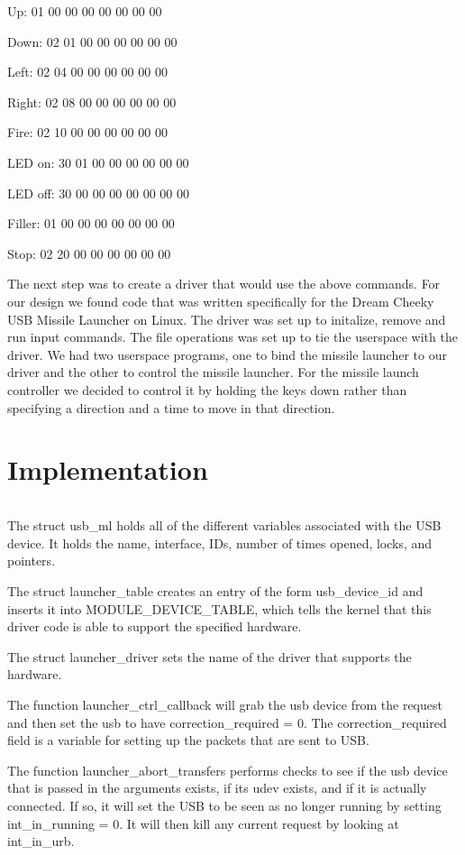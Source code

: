 \documentclass[letterpaper,10pt,titlepage]{article}
\begin{document}
Up: 01 00 00 00 00 00 00 00

Down: 02 01 00 00 00 00 00 00

Left: 02 04 00 00 00 00 00 00 

Right: 02 08 00 00 00 00 00 00

Fire: 02 10 00 00 00 00 00 00 

LED on: 30 01 00 00 00 00 00 00

LED off: 30 00 00 00 00 00 00 00

Filler: 01 00 00 00 00 00 00 00

Stop: 02 20 00 00 00 00 00 00


The next step was to create a driver that would use the above commands. For our design we found code that was written specifically for the Dream Cheeky USB Missile Launcher on Linux. The driver was set up to initalize, remove and run input commands. The file operations was set up to tie the userspace with the driver. We had two userspace programs, one to bind the missile launcher to our driver and the other to control the missile launcher. For the missile launch controller we decided to control it by holding the keys down rather than specifying a direction and a time to move in that direction.

\section{Implementation}
\begin{quotation}
\begin{verbatim}
\end{verbatim}
\end{quotation}
The struct usb\_ml holds all of the different variables associated with the USB device. It holds the name, interface, IDs, number of times opened, locks, and pointers.

The struct launcher\_table creates an entry of the form usb\_device\_id and inserts it into MODULE\_DEVICE\_TABLE, which tells the kernel that this driver code is able to support the specified hardware.

The struct launcher\_driver sets the name of the driver that supports the hardware.

The function launcher\_ctrl\_callback will grab the usb device from the request and then set the usb to have correction\_required = 0. The correction\_required field is a variable for setting up the packets that are sent to USB.

The function launcher\_abort\_transfers performs checks to see if the usb device that is passed in the arguments exists, if its udev exists, and if it is actually connected. If so, it will set the USB to be seen as no longer running by setting int\_in\_running = 0. It will then kill any current request by looking at int\_in\_urb.
\end{document}
